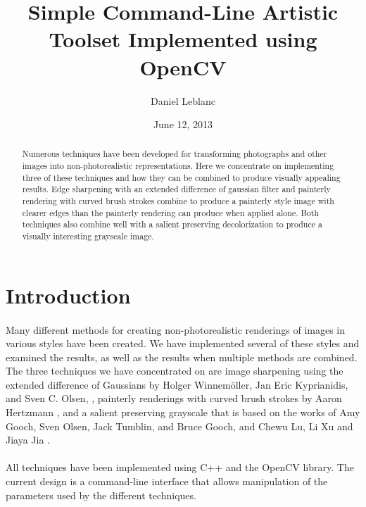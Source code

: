 \documentclass[10pt,twocolumn]{article}
\author{Daniel Leblanc}
\affil{Maseeh College of Engineering and Computer Science\\Portland State University\\Portland, OR}
\title{Simple Command-Line Artistic Toolset Implemented using OpenCV}
\date{June 12, 2013}
\begin{document}
\maketitle

\begin{abstract}
Numerous techniques have been developed for transforming photographs and other images into non-photorealistic representations.  Here we concentrate on implementing three of these techniques and how they can be combined to produce visually appealing results.  Edge sharpening with an extended difference of gaussian filter\cite{Winnemoeller:2012:XED} and painterly rendering with curved brush strokes \cite{Hertzmann:1998:PRC:280814.280951} combine to produce a painterly style image with clearer edges than the painterly rendering can produce when applied alone.  Both techniques also combine well with a salient preserving decolorization to produce a visually interesting grayscale image. 
\end{abstract}

\section{Introduction}
	\paragraph{}Many different methods for creating non-photorealistic renderings of images in various styles have been created.  We have implemented several of these styles and examined the results, as well as the results when multiple methods are combined.  The three techniques we have concentrated on are image sharpening using the extended difference of Gaussians by Holger Winnem{\"o}ller, Jan Eric Kyprianidis,  and Sven C. Olsen, \cite{ Winnemoeller:2012:XED}, painterly renderings with curved brush strokes by Aaron Hertzmann \cite{Hertzmann:1998:PRC:280814.280951}, and a salient preserving grayscale that is based on the works of Amy Gooch, Sven Olsen, Jack Tumblin, and Bruce Gooch, \cite{Gooch05color2gray:salience-preserving} and Chewu Lu, Li Xu and Jiaya Jia \cite{ lu:real-time}.
	\paragraph{} All techniques have been implemented using C++ and the OpenCV library.  The current design is a command-line interface that allows manipulation of the parameters used by the different techniques.
\end{document}
